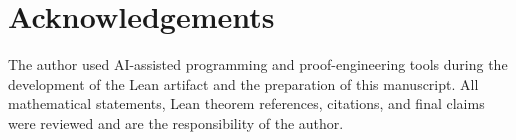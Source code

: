 \documentclass[11pt]{article}
\begin{document}
\tableofcontents














\section*{Acknowledgements}
The author used AI-assisted programming and proof-engineering tools during the
development of the Lean artifact and the preparation of this manuscript.  All
mathematical statements, Lean theorem references, citations, and final claims
were reviewed and are the responsibility of the author.

\appendix






\end{document}
